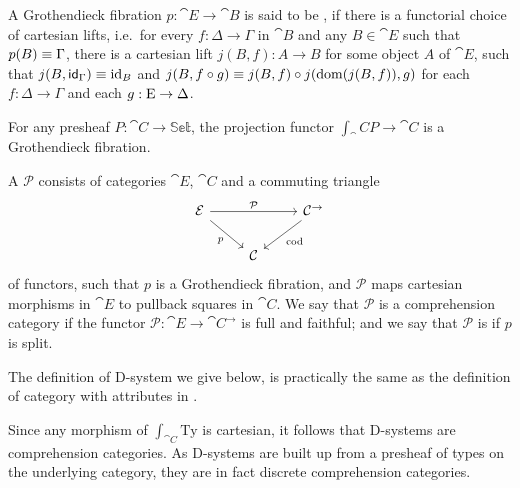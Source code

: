 \begin{defn}
A Grothendieck fibration $p:\cat{E}\to\cat{B}$ is said to be , if
there is a functorial choice of cartesian lifts, i.e.~for every $f:\Delta\to \Gamma$ in 
$\cat{B}$ and any $B\in \cat{E}$ such that $p(B)\jdeq \Gamma$,
there is a cartesian lift $j(B,f):A \to B$ for some object $A$ of $\cat{E}$, such that 
$j(B,\idfunc[\Gamma])\jdeq\catid{B}$ and 
$j(B, f\circ g)\jdeq j(B,f)\circ j(\mathrm{dom}(j(B,f)),g)$ for each
$f:\Delta\to\Gamma$ and each $g:\greek{E}\to\Delta$. 
\end{defn}

\begin{eg}
For any presheaf $P:\cat{C}\to\mathbb{Set}$, the projection functor
$\int_\cat{C} P\to\cat{C}$ is a Grothendieck fibration.
\end{eg}

\begin{defn}
A  $\mathcal{P}$ consists of categories $\cat{E}$, $\cat{C}$ and a
commuting triangle
\begin{equation*}
\begin{tikzcd}
\cat{E} \arrow[rr,"\mathcal{P}"] \arrow[dr,swap,"p"] & & \cat{C}^{\to} \arrow[dl,"\mathrm{cod}"] \\
& \cat{C}
\end{tikzcd}
\end{equation*}
of functors, such that $p$ is a Grothendieck fibration, and $\mathcal{P}$ maps
cartesian morphisms in $\cat{E}$ to pullback squares in $\cat{C}$. We say that
$\mathcal{P}$ is a  comprehension category if the functor $\mathcal{P}:
\cat{E}\to\cat{C}^{\to}$ is full and faithful; and we say that
$\mathcal{P}$ is  if $p$ is split.
\end{defn}

The definition of D-system we give below, is practically the same as the definition
of category with attributes in \cite[Definition 3.10]{Hofmann_syntax_semantics}.

\begin{rmk}
Since any morphism of $\int_{\cat{C}}\mathrm{Ty}$ is cartesian, it follows that D-systems
are comprehension categories. As D-systems are built up from a presheaf of types
on the underlying category, they are in fact discrete comprehension categories.
\end{rmk}

